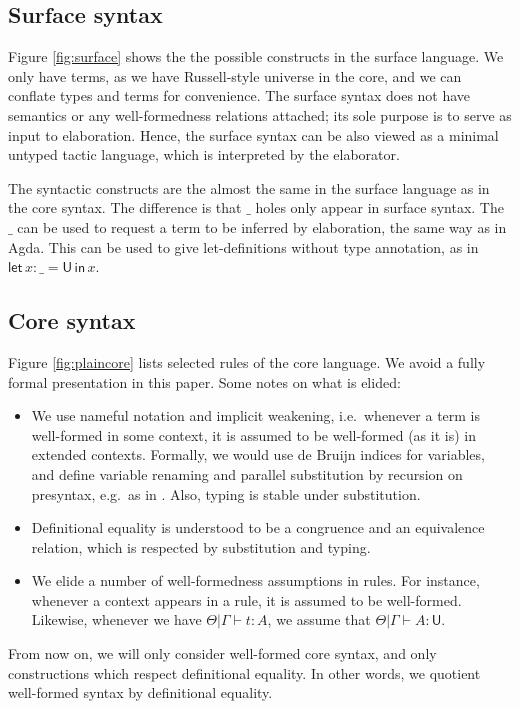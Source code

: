 \documentclass[acmsmall,review,anonymous,prologue,dvipsnames]{acmart}\settopmatter{printfolios=true,printccs=false,printacmref=false}
\newcommand{\slet}{\mathsf{let}}
\renewcommand{\sin}{\mathsf{in}}
\renewcommand{\U}{\mathsf{U}}
\begin{document}
\subsection{Surface syntax}
Figure \ref{fig:surface} shows the the possible constructs in the surface
language. We only have terms, as we have Russell-style universe in the core, and
we can conflate types and terms for convenience. The surface syntax does not
have semantics or any well-formedness relations attached; its sole purpose is to
serve as input to elaboration. Hence, the surface syntax can be also viewed as
a minimal untyped tactic language, which is interpreted by the elaborator.

The syntactic constructs are the almost the same in the surface language as in
the core syntax. The difference is that $\_$ holes only appear in surface
syntax. The $\_$ can be used to request a term to be inferred by elaboration,
the same way as in Agda.  This can be used to give let-definitions without type
annotation, as in $\slet\,x : \_ = \U\,\sin\,x$.

\subsection{Core syntax}

Figure \ref{fig:plaincore} lists selected rules of the core language. We avoid a
fully formal presentation in this paper. Some notes on what is elided:
\begin{itemize}
  \item We use nameful notation and implicit weakening, i.e.\ whenever a term is
    well-formed in some context, it is assumed to be well-formed (as it is) in
    extended contexts. Formally, we would use de Bruijn indices for variables,
    and define variable renaming and parallel substitution by recursion on
    presyntax, e.g.\ as in \cite{schafer2015autosubst}. Also, typing is stable
    under substitution.
  \item
    Definitional equality is understood to be a congruence and an equivalence relation,
    which is respected by substitution and typing.
  \item
    We elide a number of well-formedness assumptions in rules. For instance, whenever
    a context appears in a rule, it is assumed to be well-formed. Likewise, whenever
    we have $\Theta|\Gamma\vdash t : A$, we assume that $\Theta|\Gamma\vdash A : \U$.
\end{itemize}

From now on, we will only consider well-formed core syntax, and only
constructions which respect definitional equality. In other words, we quotient
well-formed syntax by definitional equality.
\end{document}
